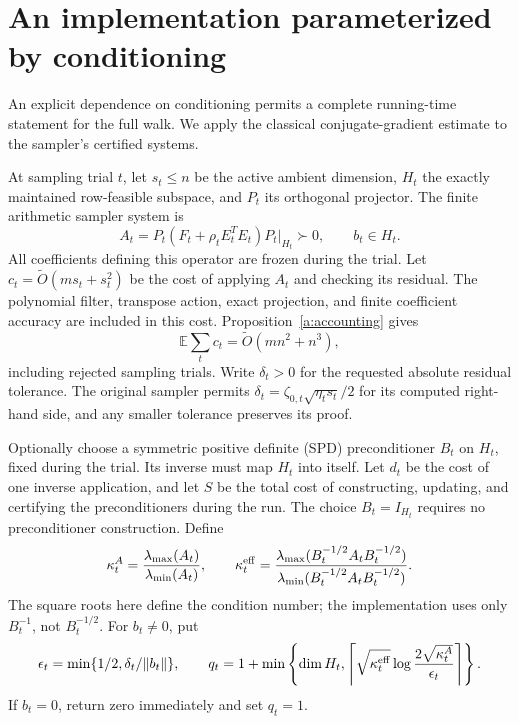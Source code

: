 \documentclass[11pt]{amsart}
\theoremstyle{definition}\newtheorem{definition}[theorem]{Definition}
\theoremstyle{remark}\newtheorem{remark}[theorem]{Remark}
\numberwithin{equation}{section}
\begin{document}
\section{An implementation parameterized by conditioning}\label{ifc:sec:kappa}
An explicit dependence on conditioning permits a complete running-time
statement for the full walk. We apply the classical conjugate-gradient estimate
\cite[Section~6.11.3]{Saad} to the sampler's certified systems.

At sampling trial $t$, let $s_t\le n$ be the active ambient dimension,
$H_t$ the exactly maintained row-feasible subspace, and $P_t$ its
orthogonal projector. The finite arithmetic sampler system is
\[
 A_t=P_t(F_t+\rho_t E_t^TE_t)P_t\big|_{H_t}\succ0,
 \qquad b_t\in H_t.
\]
All coefficients defining this operator are frozen during the trial.
Let $c_t=\widetilde O(ms_t+s_t^2)$ be the cost of applying $A_t$ and
checking its residual. The polynomial filter, transpose action, exact
projection, and finite coefficient accuracy are included in this cost.
Proposition~\ref{a:accounting} gives
\begin{equation}\label{ifc:eq:kappa-base}
 \mathbb E\sum_t c_t=\widetilde O(mn^2+n^3),
\end{equation}
including rejected sampling trials. Write $\delta_t>0$ for the requested
absolute residual tolerance. The original sampler permits
$\delta_t=\zeta_{0,t}\sqrt{\eta_ts_t}/2$ for its computed right-hand
side, and any smaller tolerance preserves its proof.

Optionally choose a symmetric positive definite (SPD) preconditioner
$B_t$ on $H_t$, fixed during the trial. Its inverse must map $H_t$ into itself. Let $d_t$ be the cost
of one inverse application, and let $S$ be the total cost of constructing,
updating, and certifying the preconditioners during the run. The choice
$B_t=I_{H_t}$ requires no preconditioner construction. Define
\[
 \kappa_t^A=\frac{\lambda_{\max}(A_t)}{\lambda_{\min}(A_t)},
 \qquad
 \kappa_t^{\rm eff}=
 \frac{\lambda_{\max}(B_t^{-1/2}A_tB_t^{-1/2})}
      {\lambda_{\min}(B_t^{-1/2}A_tB_t^{-1/2})}.
\]
The square roots here define the condition number; the implementation
uses only $B_t^{-1}$, not $B_t^{-1/2}$. For $b_t\ne0$, put
\begin{equation}\label{ifc:eq:kappa-q}
 \epsilon_t=\min\{1/2,\delta_t/\|b_t\|\},\qquad
 q_t=1+\min\left\{\dim H_t,
  \left\lceil\sqrt{\kappa_t^{\rm eff}}
       \log\frac{2\sqrt{\kappa_t^A}}{\epsilon_t}\right\rceil\right\}.
\end{equation}
If $b_t=0$, return zero immediately and set $q_t=1$.
\end{document}
